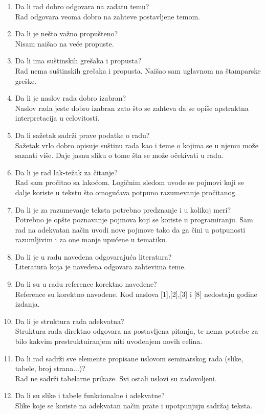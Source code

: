 \documentclass[a4paper]{report}
\begin{document}
\begin{enumerate}
\item Da li rad dobro odgovara na zadatu temu?\\
Rad odgovara veoma dobro na zahteve postavljene temom.
\item Da li je nešto važno propušteno?\\
Nisam naišao na veće propuste.
\item Da li ima suštinskih grešaka i propusta?\\
Rad nema suštinskih grešaka i propusta. Naišao sam uglavnom na štamparske greške.
\item Da li je naslov rada dobro izabran?\\
Naslov rada jeste dobro izabran zato što se zahteva da se opiše apstraktna interpretacija u celovitosti.
\item Da li sažetak sadrži prave podatke o radu?\\
Sažetak vrlo dobro opisuje suštinu rada kao i teme o kojima se u njemu može saznati više. Daje jasnu sliku o tome šta se može očekivati u radu.
\item Da li je rad lak-težak za čitanje?\\
Rad sam pročitao sa lakoćom. Logičnim sledom uvode se pojmovi koji se dalje koriste u tekstu što omogućava potpuno razumevanje pročitanog.
\item Da li je za razumevanje teksta potrebno predznanje i u kolikoj meri?\\
Potrebno je opšte poznavanje pojmova koji se koriste u programiranju. Sam rad na adekvatan način uvodi nove pojmove tako da ga čini u potpunosti razumljivim i za one manje upućene u tematiku.
\item Da li je u radu navedena odgovarajuća literatura?\\
Literatura koja je navedena odgovara zahtevima teme.
\item Da li su u radu reference korektno navedene?\\
Reference su korektno navođene. Kod naslova [1],[2],[3] i [8] nedostaju godine izdanja.
\item Da li je struktura rada adekvatna?\\
Struktura rada direktno odgovara na postavljena pitanja, te nema potrebe za bilo kakvim prestruktuiranjem niti uvođenjem novih celina.
\item Da li rad sadrži sve elemente propisane uslovom seminarskog rada (slike, tabele, broj strana...)?\\
Rad ne sadrži tabelarne prikaze. Svi ostali uslovi su zadovoljeni.
\item Da li su slike i tabele funkcionalne i adekvatne?\\
Slike koje se koriste na adekvatan način prate i upotpunjuju sadržaj teksta.
\end{enumerate}
\end{document}
